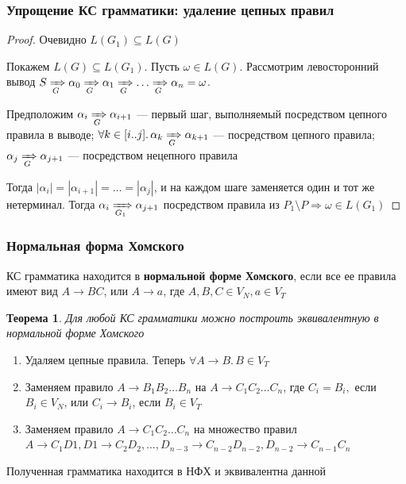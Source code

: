 \documentclass{beamer}
\newtheorem{rutheorem}{Теорема}
\newcommand{\derivegone}[1]{\xRightarrow[#1]{}}
\begin{document}
\begin{frame}[fragile]
  \transwipe[direction=90]
  \frametitle{Упрощение КС грамматики: удаление цепных правил}    
  \begin{proof}   
   Очевидно $L(G_1) \subseteq L(G)$
   
   Покажем $L(G) \subseteq L(G_1)$. Пусть $\omega \in L(G)$. Рассмотрим левосторонний вывод $S \derivegone{G} \alpha_0 \derivegone{G} \alpha_1 \derivegone{G} \dots \derivegone{G} \alpha_n = \omega$.
   
   Предположим $\alpha_i \derivegone{G} \alpha_{i+1}$ --- первый шаг, выполняемый посредством цепного правила в выводе; $\forall k \in [i..j]. \, \alpha_k \derivegone{G} \alpha_{k+1}$ --- посредством цепного правила;  $\alpha_j \derivegone{G} \alpha_{j+1}$  --- посредством нецепного правила
   
   Тогда $|\alpha_i| = |\alpha_{i+1}| = \dots = |\alpha_j|$, и на каждом шаге заменяется один и тот же нетерминал. Тогда $\alpha_i \derivegone{G_1} \alpha_{j+1} $ посредством правила из $P_1 \setminus P \Rightarrow \omega \in L(G_1)$
   \end{proof}
   
\end{frame}

 
\begin{frame}[fragile]
  \transwipe[direction=90]
  \frametitle{Нормальная форма Хомского}    
  КС грамматика находится в \textbf{нормальной форме Хомского}, если все ее правила имеют вид $A \rightarrow B C$, или $A \rightarrow a$, где $A,B,C \in V_N, a \in V_T$
  
  \begin{rutheorem}   
    Для любой КС грамматики можно построить эквивалентную в нормальной форме Хомского
  \end{rutheorem}

     \begin{enumerate}
    \item Удаляем цепные правила. Теперь $\forall A \rightarrow B. \, B \in V_T$
    \item Заменяем правило $A \rightarrow B_1 B_2 \dots B_n$ на $A \rightarrow C_1 C_2 \dots C_n$, где $C_i = B_i,$ если $B_i \in V_N$, или $C_i \rightarrow B_i$, если $B_i \in V_T$
    \item Заменяем правило $A \rightarrow C_1 C_2 \dots C_n$ на множество правил $A \rightarrow C_1 D1, D1 \rightarrow C_2 D_2, \dots, D_{n-3} \rightarrow C_{n-2} D_{n-2}, D_{n-2} \rightarrow C_{n-1} C_n$
  \end{enumerate}
  
        Полученная грамматика находится в НФХ и эквивалентна данной 
\end{frame}
\end{document}
